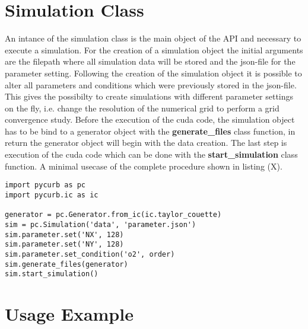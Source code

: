 \section{Simulation Class}

An intance of the simulation class is the main object of the API and
necessary to execute a simulation. For the creation of a simulation object
the initial arguments are the filepath where all simulation data will be stored
and the json-file for the parameter setting.
Following the creation of the simulation object it is possible to alter all parameters and conditions
which were previously stored in the json-file. This gives the possibilty to create
simulations with different parameter settings on the fly, i.e. change the resolution of the numerical grid
to perform a grid convergence study.
Before the execution of the cuda code, the simulation object has to be bind to a generator object
with the \textbf{generate\_files} class function, in return the generator object will begin
with the data creation. The last step is execution of the cuda code which can be done with the \textbf{start\_simulation}
class function.  A minimal usecase of the complete procedure shown in listing (X).


\begin{minipage}{\linewidth}
\begin{lstlisting}[caption='Generator class usage']
import pycurb as pc
import pycurb.ic as ic

generator = pc.Generator.from_ic(ic.taylor_couette)
sim = pc.Simulation('data', 'parameter.json')
sim.parameter.set('NX', 128)
sim.parameter.set('NY', 128)
sim.parameter.set_condition('o2', order)
sim.generate_files(generator)
sim.start_simulation()
\end{lstlisting}
\end{minipage}

\section{Usage Example}

